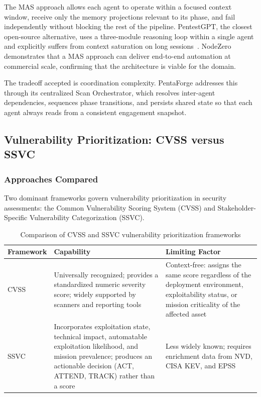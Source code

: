 \documentclass[12pt,a4paper]{report}
\begin{document}
The MAS approach allows each agent to operate within a focused context
window, receive only the memory projections relevant to its phase, and
fail independently without blocking the rest of the pipeline. PentestGPT,
the closest open-source alternative, uses a three-module reasoning loop
within a single agent and explicitly suffers from context saturation on
long sessions~\cite{pentestgpt2023}. NodeZero demonstrates that a MAS
approach can deliver end-to-end automation at commercial scale, confirming
that the architecture is viable for the domain.

The tradeoff accepted is coordination complexity. PentaForge addresses
this through its centralized Scan Orchestrator, which resolves
inter-agent dependencies, sequences phase transitions, and persists shared
state so that each agent always reads from a consistent engagement
snapshot.

\subsection{Vulnerability Prioritization: CVSS versus SSVC}

\subsubsection{Approaches Compared}

Two dominant frameworks govern vulnerability prioritization in security
assessments: the Common Vulnerability Scoring System (CVSS) and
Stakeholder-Specific Vulnerability Categorization (SSVC).

\begin{table}[H]
    \centering
    \renewcommand{\arraystretch}{1.35}
    \begin{tabular}{|p{}|p{}|p{}|}
        \hline
        \textbf{Framework} & \textbf{Capability} & \textbf{Limiting Factor} \\
        \hline
        CVSS & Universally recognized; provides a standardized numeric
        severity score; widely supported by scanners and reporting tools &
        Context-free: assigns the same score regardless of the deployment
        environment, exploitability status, or mission criticality of the
        affected asset \\
        \hline
        SSVC & Incorporates exploitation state, technical impact,
        automatable exploitation likelihood, and mission prevalence;
        produces an actionable decision (ACT, ATTEND, TRACK) rather than
        a score & Less widely known; requires enrichment data from NVD,
        CISA KEV, and EPSS \\
        \hline
    \end{tabular}
    \caption{Comparison of CVSS and SSVC vulnerability prioritization frameworks}
    \label{tab:ssvc_approaches}
\end{table}
\end{document}
